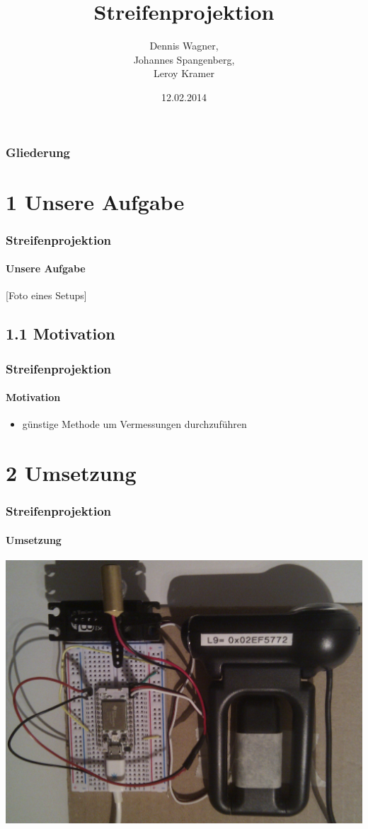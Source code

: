 \documentclass{beamer}
\title{Streifenprojektion}
\author{Dennis Wagner, \\ Johannes Spangenberg, \\ Leroy Kramer}
\date{12.02.2014}
\begin{document}
\frame{\titlepage} 


\begin{frame}
	\frametitle{Gliederung}
	\tableofcontents
\end{frame} 


\section{1 \hspace{5px} Unsere Aufgabe} 
\begin{frame}
	\frametitle{Streifenprojektion}
	\framesubtitle{Unsere Aufgabe}

	[Foto eines Setups]

\end{frame}


\subsection{1.1 \hspace{5px} Motivation} 
\begin{frame}
	\frametitle{Streifenprojektion}
	\framesubtitle{Motivation}

	\begin{itemize}
		\item günstige Methode um Vermessungen durchzuführen
	\end{itemize}

\end{frame}


\section{2 \hspace{5px} Umsetzung} 
\begin{frame}
	\frametitle{Streifenprojektion}
	\framesubtitle{Umsetzung}

	\includegraphics[width=0.9\linewidth]{includes/hardware.jpg}

\end{frame}
\end{document}
